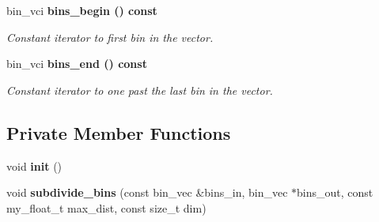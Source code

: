 \begin{CompactItemize}
\item 
bin\_\-vci \bf{bins\_\-begin} () const \label{classSimSite3D_1_1geometry_1_1FaceBins_03cd049c988e3cecd9d0fa8a9a035043}

\begin{CompactList}\small\item\em Constant iterator to first bin in the vector. \item\end{CompactList}\item 
bin\_\-vci \bf{bins\_\-end} () const \label{classSimSite3D_1_1geometry_1_1FaceBins_1e5f80ab1a6e5cf04415c80b8c8e6cc5}

\begin{CompactList}\small\item\em Constant iterator to one past the last bin in the vector. \item\end{CompactList}\end{CompactItemize}
\subsection*{Private Member Functions}
\begin{CompactItemize}
\item 
void \textbf{init} ()\label{classSimSite3D_1_1geometry_1_1FaceBins_f81405e328ea773342dc75e8a343ee6b}

\item 
void \textbf{subdivide\_\-bins} (const bin\_\-vec \&bins\_\-in, bin\_\-vec $\ast$bins\_\-out, const my\_\-float\_\-t max\_\-dist, const size\_\-t dim)\label{classSimSite3D_1_1geometry_1_1FaceBins_d2ef0a7082f69f208e9fc3a7f28dd4c3}

\end{CompactItemize}
